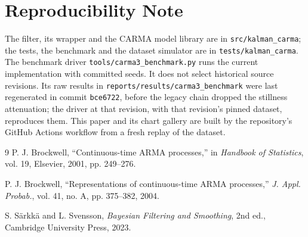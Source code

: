 \documentclass[conference]{IEEEtran}
\theoremstyle{bodysmall}
\begin{document}
\section*{Reproducibility Note}
The filter, its wrapper and the CARMA model library are in
\texttt{src/kalman\_carma}; the tests, the benchmark and the dataset
simulator are in \texttt{tests/kalman\_carma}. The benchmark driver
\texttt{tools/carma3\_benchmark.py} runs the current implementation with committed seeds. It does not
select historical source revisions. Its raw results in
\texttt{reports/results/carma3\_benchmark} were last regenerated in commit
\texttt{bce6722}, before the legacy chain dropped the stillness attenuation;
the driver at that revision, with that revision's pinned dataset, reproduces
them. This paper and its chart gallery are built by the repository's GitHub
Actions workflow from a fresh replay of the dataset.

\begin{thebibliography}{9}
P. J. Brockwell, ``Continuous-time ARMA processes,'' in \emph{Handbook of
Statistics}, vol. 19, Elsevier, 2001, pp. 249--276.

P. J. Brockwell, ``Representations of continuous-time ARMA processes,''
\emph{J. Appl. Probab.}, vol. 41, no. A, pp. 375--382, 2004.

S. S\"arkk\"a and L. Svensson, \emph{Bayesian Filtering and Smoothing},
2nd ed., Cambridge University Press, 2023.
\end{thebibliography}
\end{document}

